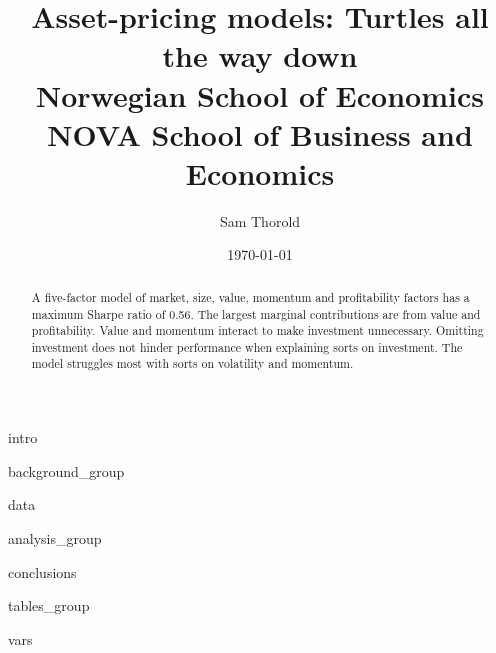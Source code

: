 \documentclass[a4paper, 12pt]{article}
\title{
  {Asset-pricing models: Turtles all the way down}\\
  {\large Norwegian School of Economics}\\
  {\large NOVA School of Business and Economics}
}
\author{Sam Thorold}
\date{\today}
\begin{document}

\begin{abstract}
  A five-factor model of
  market, size, value, momentum and profitability factors
  has a maximum Sharpe ratio of 0.56.
  The largest marginal contributions are from value and profitability.
  Value and momentum interact to make investment unnecessary.
  Omitting investment does not hinder performance when explaining sorts on investment.
  The model struggles most with sorts on volatility and momentum.
\end{abstract}

{intro}

{background_group}

{data}

{analysis_group}

{conclusions}


\printbibliography


\appendix

{tables_group}

{vars}
\end{document}
